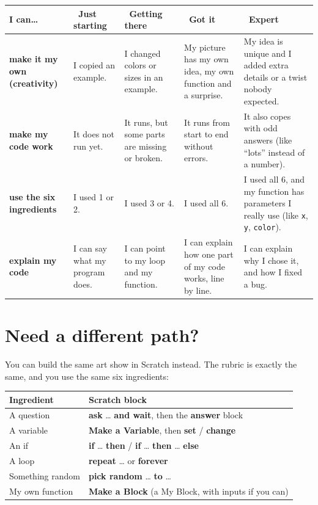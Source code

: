 \documentclass[level=1]{kidscode}
\newcommand{\lvA}{\faSeedling\ Just starting}
\newcommand{\lvB}{\faShoePrints\ Getting there}
\newcommand{\lvC}{\faCheckCircle\ Got it}
\newcommand{\lvD}{\faRocket\ Expert}
\begin{document}
{\small\renewcommand{\arraystretch}{1.3}
\begin{tabularx}{\linewidth}{@{}>{\bfseries\RaggedRight}p{2.5cm}*{4}{>{\RaggedRight\arraybackslash}X}@{}}
\toprule
I can\dots & \lvA & \lvB & \lvC & \lvD\\
\midrule
make it my own (creativity) & I copied an example. & I changed colors or sizes in an example. & My picture has my own idea, my own function and a surprise. & My idea is unique and I added extra details or a twist nobody expected.\\
\midrule
make my code work & It does not run yet. & It runs, but some parts are missing or broken. & It runs from start to end without errors. & It also copes with odd answers (like \enquote{lots} instead of a number).\\
\midrule
use the six ingredients & I used 1 or 2. & I used 3 or 4. & I used all 6. & I used all 6, and my function has parameters I really use (like \texttt{x}, \texttt{y}, \texttt{color}).\\
\midrule
explain my code & I can say what my program does. & I can point to my loop and my function. & I can explain how one part of my code works, line by line. & I can explain why I chose it, and how I fixed a bug.\\
\bottomrule
\end{tabularx}}

\section{Need a different path?}
\begin{tip}
You can build the same art show in Scratch instead. The rubric is exactly the same,
and you use the same six ingredients:
\begin{center}
\small\renewcommand{\arraystretch}{1.3}
\begin{tabular}{@{}ll@{}}
\toprule
Ingredient & Scratch block\\
\midrule
A question & \textbf{ask} \dots{} \textbf{and wait}, then the \textbf{answer} block\\
A variable & \textbf{Make a Variable}, then \textbf{set} / \textbf{change}\\
An if & \textbf{if} \dots{} \textbf{then} / \textbf{if} \dots{} \textbf{then} \dots{} \textbf{else}\\
A loop & \textbf{repeat} \dots{} or \textbf{forever}\\
Something random & \textbf{pick random} \dots{} \textbf{to} \dots\\
My own function & \textbf{Make a Block} (a My Block, with inputs if you can)\\
\bottomrule
\end{tabular}
\end{center}
\end{tip}
\end{document}
